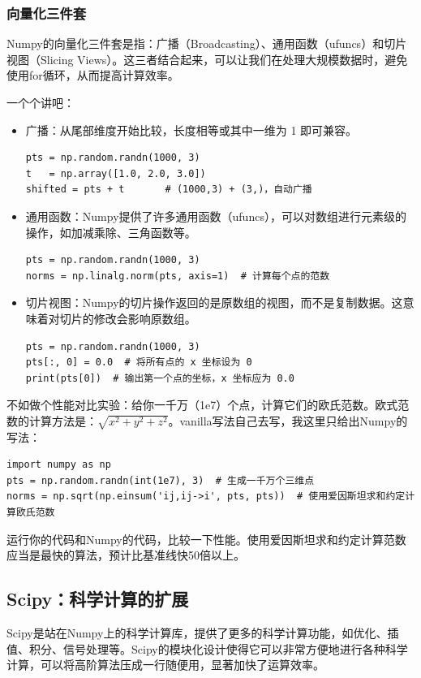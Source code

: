 \documentclass[../main.tex]{subfiles}
\begin{document}
\subsubsection{向量化三件套}

Numpy的向量化三件套是指：广播（Broadcasting）、通用函数（ufuncs）和切片视图（Slicing Views）。这三者结合起来，可以让我们在处理大规模数据时，避免使用for循环，从而提高计算效率。

一个个讲吧：
\begin{itemize}
    \item 广播：从尾部维度开始比较，长度相等或其中一维为 1 即可兼容。
    \begin{lstlisting}
pts = np.random.randn(1000, 3)
t   = np.array([1.0, 2.0, 3.0])
shifted = pts + t       # (1000,3) + (3,)，自动广播
    \end{lstlisting}
    \item 通用函数：Numpy提供了许多通用函数（ufuncs），可以对数组进行元素级的操作，如加减乘除、三角函数等。
    \begin{lstlisting}
pts = np.random.randn(1000, 3)
norms = np.linalg.norm(pts, axis=1)  # 计算每个点的范数
\end{lstlisting}
    \item 切片视图：Numpy的切片操作返回的是原数组的视图，而不是复制数据。这意味着对切片的修改会影响原数组。
    \begin{lstlisting}
pts = np.random.randn(1000, 3)
pts[:, 0] = 0.0  # 将所有点的 x 坐标设为 0
print(pts[0])  # 输出第一个点的坐标，x 坐标应为 0.0
    \end{lstlisting}
\end{itemize}

不如做个性能对比实验：给你一千万（1e7）个点，计算它们的欧氏范数。欧式范数的计算方法是：$\sqrt{x^2 + y^2 + z^2}$。vanilla写法自己去写，我这里只给出Numpy的写法：
\begin{lstlisting}
import numpy as np
pts = np.random.randn(int(1e7), 3)  # 生成一千万个三维点
norms = np.sqrt(np.einsum('ij,ij->i', pts, pts))  # 使用爱因斯坦求和约定计算欧氏范数
\end{lstlisting}
运行你的代码和Numpy的代码，比较一下性能。使用爱因斯坦求和约定计算范数应当是最快的算法，预计比基准线快50倍以上。

\subsection{Scipy：科学计算的扩展}

Scipy是站在Numpy上的科学计算库，提供了更多的科学计算功能，如优化、插值、积分、信号处理等。Scipy的模块化设计使得它可以非常方便地进行各种科学计算，可以将高阶算法压成一行随便用，显著加快了运算效率。
\end{document}

